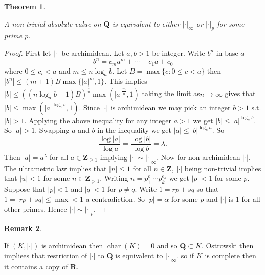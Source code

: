 \documentclass[10pt,]{book}
\newcommand{\lt}{<}
\newcommand{\gt}{>}
\theoremstyle{plain}
\newtheorem{theorem}{Theorem}[section]
\theoremstyle{definition}
\newtheorem{remark}[theorem]{Remark}
\newcommand{\QQ}{\mathbf{Q}}
\newcommand{\RR}{\mathbf{R}}
\newcommand{\ZZ}{\mathbf{Z}}
\newcommand{\ab}{|\cdot|}
\DeclareMathOperator{\chara}{char}
\begin{document}
\begin{theorem}\label{theorem-1}

          A non-trivial absolute value on \(\QQ\) is equivalent to either \(\ab_\infty\) or \(\ab_p\) for some prime \(p\).
        \end{theorem}
\begin{proof}

          First let \(\ab\) be archimidean.
          Let \(a,b\gt 1\) be integer.
          Write \(b^n\) in base \(a\)\[b^n = c_m a^m + \cdots + c_1a + c_0\]
          where \(0\le c_i\lt a\) and \(m\le n\log_a b\).
          Let \(B= \max\{c : 0 \le c \lt a\}\) then \(|b^n| \le (m+1)B \max\{|a|^m,1\}\).
          This implies \(|b| \le ((n\log_a b + 1)B)^{\frac{1}{n}}\max(|a|^{\frac{m}{n}}, 1)\) taking the limit as\(n \to \infty\) gives that \(|b| \le \max(|a|^{\log_a b}, 1)\).
          Since \(\ab\) is archimidean we may pick an integer \(b\gt 1\) s.t. \(|b| \gt 1\).
          Applying the above inequality for any integer \(a \gt 1\) we get \(|b| \le |a|^{\log_a b}\).
          So \(|a| \gt 1\).
          Swapping \(a\) and \(b\) in the inequality we get \(|a| \le |b|^{\log_b a}\).
          So \[\frac{\log|a|}{\log a} = \frac{\log|b|}{\log b} = \lambda.\]
          Then \(|a| = a^{\lambda}\) for all \(a\in \ZZ_{\ge 1}\) implying \(\ab \sim \ab_\infty\).
          \newline{}
          Now for non-archimidean \(\ab\).
          The ultrametric law implies that \(|n| \le 1\) for all \(n\in \ZZ\),
          \(\ab\) being non-trivial implies that \(|u| \lt 1\) for some \(n\in \ZZ_{\gt 1}\).
          Writing \(n = p_1^{e_1}\cdots p_k^{e_k}\) we get \(|p| \lt 1\) for some \(p\).
          Suppose that \(|p| \lt 1\) and \(|q| \lt 1\) for \(p\ne q\).
          Write \(1 = rp + sq\) so that \(1 = |rp + sq| \le \max \lt 1\) a contradiction.
          So \(|p| =\alpha \) for some \(p\) and \(\ab\) is 1 for all other primes.
          Hence \(\ab \sim\ab_p\).
        \end{proof}
\begin{remark}\label{remark-3}

          If \((K,\ab)\) is archimidean then \(\chara(K) = 0\) and so \(\QQ \subset K\).
          Ostrowski  then impliees that restriction of \(\ab\) to \(\QQ\) is equivalent to \(\ab_\infty\).
          so if \(K\) is complete then it contains a copy of \(\RR\).
        \end{remark}
\par
\end{document}

